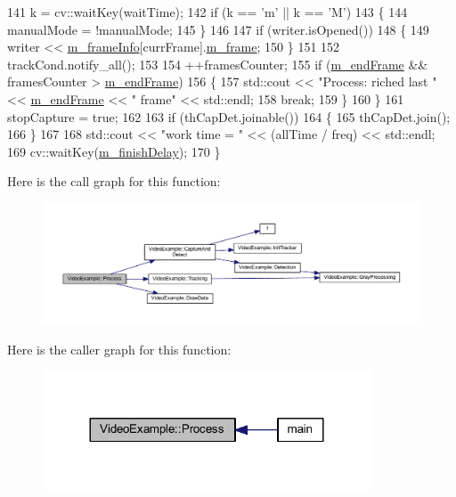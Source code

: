 \begin{DoxyCode}
141         k = cv::waitKey(waitTime);
142         \textcolor{keywordflow}{if} (k == \textcolor{charliteral}{'m'} || k == \textcolor{charliteral}{'M'})
143         \{
144             manualMode = !manualMode;
145         \}
146 
147         \textcolor{keywordflow}{if} (writer.isOpened())
148         \{
149             writer << \mbox{\hyperlink{class_video_example_af5363ad3ed9a34bd105dbdaf274acb66}{m\_frameInfo}}[currFrame].\mbox{\hyperlink{struct_video_example_1_1_frame_info_ace63373cca952f2c7f281b18220f9f8c}{m\_frame}};
150         \}
151 
152         trackCond.notify\_all();
153 
154         ++framesCounter;
155         \textcolor{keywordflow}{if} (\mbox{\hyperlink{class_video_example_ae44e854b8a76b3d4f6393582afd70e67}{m\_endFrame}} && framesCounter > \mbox{\hyperlink{class_video_example_ae44e854b8a76b3d4f6393582afd70e67}{m\_endFrame}})
156         \{
157             std::cout << \textcolor{stringliteral}{"Process: riched last "} << \mbox{\hyperlink{class_video_example_ae44e854b8a76b3d4f6393582afd70e67}{m\_endFrame}} << \textcolor{stringliteral}{" frame"} << std::endl;
158             \textcolor{keywordflow}{break};
159         \}
160     \}
161     stopCapture = \textcolor{keyword}{true};
162 
163     \textcolor{keywordflow}{if} (thCapDet.joinable())
164     \{
165         thCapDet.join();
166     \}
167 
168     std::cout << \textcolor{stringliteral}{"work time = "} << (allTime / freq) << std::endl;
169     cv::waitKey(\mbox{\hyperlink{class_video_example_ac21a646c343edd4c11db034fa2c8c085}{m\_finishDelay}});
170 \}
\end{DoxyCode}
Here is the call graph for this function\+:\nopagebreak
\begin{figure}[H]
\begin{center}
\leavevmode
\includegraphics[width=350pt]{class_video_example_a87efc66a82c36ad3380623d30a12abf2_cgraph}
\end{center}
\end{figure}
Here is the caller graph for this function\+:\nopagebreak
\begin{figure}[H]
\begin{center}
\leavevmode
\includegraphics[width=276pt]{class_video_example_a87efc66a82c36ad3380623d30a12abf2_icgraph}
\end{center}
\end{figure}
